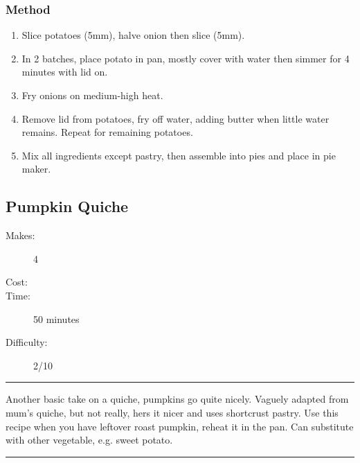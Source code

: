 \documentclass[]{article}
\begin{document}
\subsubsection*{\Large Method}
\begin{enumerate}[font=\huge\color{accent}]
	\item Slice potatoes (5mm), halve onion then slice (5mm).
	\item In 2 batches, place potato in pan, mostly cover with water then simmer for 4 minutes with lid on.
	\item Fry onions on medium-high heat.
	\item Remove lid from potatoes, fry off water, adding butter when little water remains. Repeat for remaining potatoes.
	\item Mix all ingredients except pastry, then assemble into pies and place in pie maker.
\end{enumerate}
\newpage
{}\label{rec:Pumpkin Quiche}
\subsection*{\center\huge Pumpkin Quiche}
\begin{description}
\item[Makes:] 4 
\item[Cost:] \textdollar
\item[Time:] 50 minutes
\item[Difficulty:] 2/10
\end{description}
\vspace{0.2cm}\hrule\vspace{0.5cm}
\begin{adjustwidth}{0.5 cm}{0.5 cm}

Another basic take on a quiche, pumpkins go quite nicely. Vaguely adapted from mum's quiche, but not really, hers it nicer and uses shortcrust pastry. Use this recipe when you have leftover roast pumpkin, reheat it in the pan. Can substitute with other vegetable, e.g. sweet potato. \hfill{}\color{black}

\end{adjustwidth}
\vspace{0.5cm}\hrule
\end{document}
